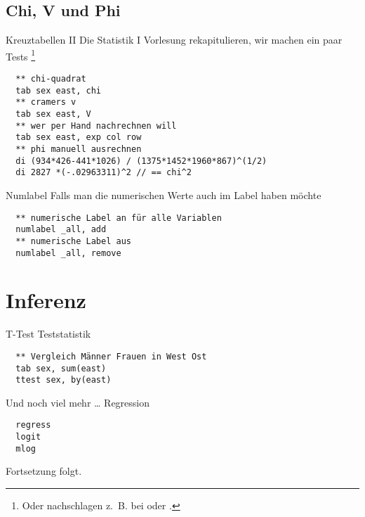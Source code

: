 \subsection{Chi, V und Phi}
\begin{frame}[fragile]{Kreuztabellen II}         
Die Statistik I Vorlesung rekapitulieren, wir machen ein paar Tests \footnote{Oder nachschlagen z.~B. bei \textcite{Krebs10} oder \textcite{Agresti09}. }
\begin{lstlisting}
  ** chi-quadrat
  tab sex east, chi
  ** cramers v
  tab sex east, V
  ** wer per Hand nachrechnen will
  tab sex east, exp col row
  ** phi manuell ausrechnen
  di (934*426-441*1026) / (1375*1452*1960*867)^(1/2)
  di 2827 *(-.02963311)^2 // == chi^2
\end{lstlisting}

\end{frame}

\begin{frame}[fragile]{Numlabel}
Falls man die numerischen Werte auch im Label haben möchte 
\begin{lstlisting}
  ** numerische Label an für alle Variablen
  numlabel _all, add
  ** numerische Label aus
  numlabel _all, remove
\end{lstlisting}

\end{frame}

\section{Inferenz}
\begin{frame}[fragile]{T-Test}  
Teststatistik
\begin{lstlisting}
  ** Vergleich Männer Frauen in West Ost
  tab sex, sum(east)
  ttest sex, by(east)
\end{lstlisting}
\end{frame}

\begin{frame}[fragile]{Und noch viel mehr \dots}   
Regression
\begin{lstlisting}
  regress
  logit
  mlog
\end{lstlisting}
\end{frame}

\begin{frame}
\thispagestyle{empty}
 Fortsetzung folgt.
\end{frame}
